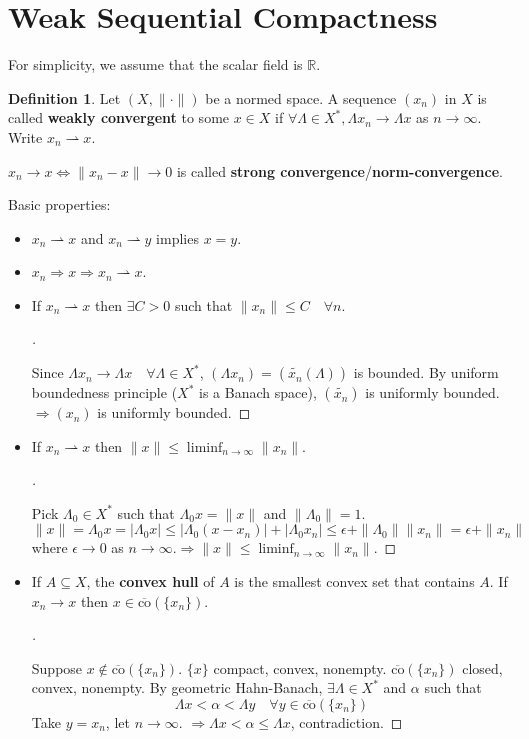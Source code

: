 \documentclass{article}
\theoremstyle{definition}
\newtheorem{dfn}{Definition}
\newenvironment{proofs}[1][\proofname]{%
  \begin{proof}[#1]$ $\par\nobreak\ignorespaces
}{%
  \end{proof}
}
\newcommand{\RR}{\mathbb R}
\newcommand{\ra}{\rightarrow}
\newcommand{\Ra}{\Rightarrow}
\begin{document}
\section{Weak Sequential Compactness}

For simplicity, we assume that the scalar field is $\RR$.

\begin{dfn}
	Let $(X, \|\cdot\|)$ be a normed space.
	A sequence $(x_n)$ in $X$ is called \textbf{weakly convergent} to some $x \in X$ if $\forall \Lambda \in X^*, \Lambda x_n \to \Lambda x$ as $n \to \infty$.
	Write $x_n \rightharpoonup x$.
\end{dfn}

$x_n \to x \Leftrightarrow \|x_n - x \| \to 0$ is called \textbf{strong convergence}/\textbf{norm-convergence}.

\par Basic properties:
\begin{itemize}
	\item $x_n \rightharpoonup x$ and $x_n \rightharpoonup y$ implies $x = y$.

	\item $x_n \Rightarrow x \Rightarrow x_n \rightharpoonup x$.

	\item If $x_n \rightharpoonup x$ then $\exists C > 0$ such that $\|x_n\| \leq C \quad \forall n$.
		\begin{proofs}
			Since $\Lambda x_n \to \Lambda x \quad \forall \Lambda \in X^*$, $(\Lambda x_n) = (\tilde{x_n}(\Lambda))$ is bounded.
			By uniform boundedness principle ($X^*$ is a Banach space), $(\tilde{x_n})$ is uniformly bounded.
			$\Rightarrow (x_n)$ is uniformly bounded.
		\end{proofs}

	\item If $x_n \rightharpoonup x$ then $\|x\| \leq \liminf_{n \to \infty} \|x_n\|$.
		\begin{proofs}
			Pick $\Lambda_0 \in X^*$ such that $\Lambda_0 x = \|x\|$ and $\|\Lambda_0\| = 1$.
			\[
				\|x\| = \Lambda_0 x = |\Lambda_0 x| \leq |\Lambda_0 (x - x_n)| + |\Lambda_0 x_n| \leq \epsilon + \|\Lambda_0 \| \|x_n \| = \epsilon + \|x_n\|
			\]
			where $\epsilon \to 0$ as $n \to \infty$.$\Ra \|x\| \leq \liminf_{n \to \infty} \|x_n\|$.
		\end{proofs}

	\item If $A \subseteq X$, the \textbf{convex hull} of $A$ is the smallest convex set that contains $A$.
		If $x_n \ra x$ then $x \in \overline{\text{co}}(\{x_n\})$.
		\begin{proofs}
			Suppose $x \notin \overline{\text{co}}(\{x_n\})$.
			$\{x\}$ compact, convex, nonempty.
			$\overline{\text{co}}(\{x_n\})$ closed, convex, nonempty.
			By geometric Hahn-Banach, $\exists \Lambda \in X^*$ and $\alpha$ such that 
			\[
				\Lambda x < \alpha < \Lambda y \quad \forall y \in \overline{\text{co}}(\{x_n\})
			\]
			Take $y = x_n$, let $n \to \infty$.
			$\Rightarrow \Lambda x < \alpha \leq \Lambda x$, contradiction.
		\end{proofs}
\end{itemize}
\end{document}
